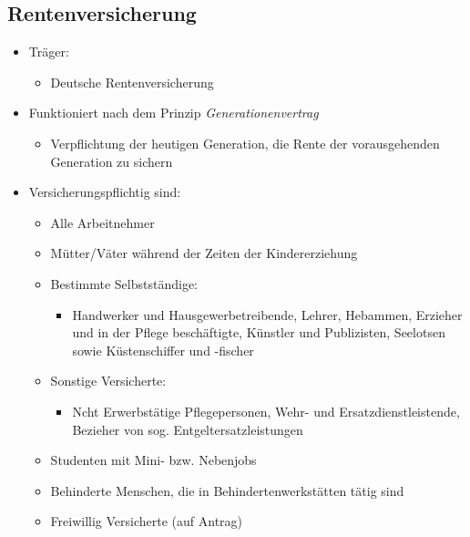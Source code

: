 \documentclass[a4paper, 12pt]{report}
\begin{document}
\newpage
\subsection{Rentenversicherung}

\begin{itemize}
    \item Träger: 
        \begin{itemize}
            \item Deutsche Rentenversicherung
        \end{itemize}
    \item Funktioniert nach dem Prinzip \emph{Generationenvertrag}
        \begin{itemize}
            \item Verpflichtung der heutigen Generation, die Rente der 
                vorausgehenden Generation zu sichern
        \end{itemize}
    \item Versicherungspflichtig sind:
        \begin{itemize}
            \item Alle Arbeitnehmer
            \item Mütter/Väter während der Zeiten der Kindererziehung
            \item Bestimmte Selbstständige:
                \begin{itemize}
                    \item Handwerker und Hausgewerbetreibende, Lehrer, Hebammen, 
                        Erzieher und in der Pflege beschäftigte, Künstler und 
                        Publizisten, Seelotsen sowie Küstenschiffer und -fischer
                \end{itemize}
            \item Sonstige Versicherte:
                \begin{itemize}
                    \item Ncht Erwerbstätige Pflegepersonen, Wehr- und 
                        Ersatzdienstleistende, Bezieher von sog. 
                        Entgeltersatzleistungen
                \end{itemize}
            \item Studenten mit Mini- bzw. Nebenjobs
            \item Behinderte Menschen, die in Behindertenwerkstätten tätig sind
            \item Freiwillig Versicherte (auf Antrag)
        \end{itemize}

\end{itemize}
\end{document}
